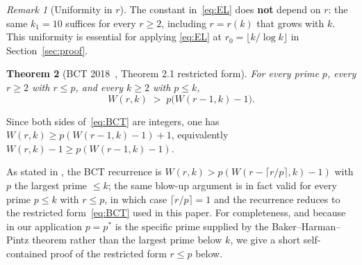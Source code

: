 \documentclass[11pt,reqno,a4paper]{amsart}
\theoremstyle{plain}
\newtheorem{theorem}{Theorem}[section]
\theoremstyle{definition}
\theoremstyle{remark}
\newtheorem{remark}[theorem]{Remark}
\numberwithin{equation}{section}
\begin{document}
\begin{remark}[Uniformity in $r$]
\label{rem:EL-uniform}
The constant in~\eqref{eq:EL} does \textbf{not} depend on $r$: the
same $k_{1}=10$ suffices for every $r\ge 2$, including
$r=r(k)$ that grows with $k$. This uniformity is essential for applying
\eqref{eq:EL} at $r_{0}=\lfloor k/\log k\rfloor$ in
Section~\ref{sec:proof}.
\end{remark}

\begin{theorem}[BCT 2018~\cite{BCT}, Theorem 2.1 restricted form]
\label{thm:BCT}
For every prime $p$, every $r\ge 2$ with $r\le p$, and every $k\ge 2$
with $p\le k$,
\begin{equation}
W(r,k)\;>\;p\bigl(W(r-1,k)-1\bigr).
\label{eq:BCT}
\end{equation}
\end{theorem}

\noindent Since both sides of~\eqref{eq:BCT} are integers, one has
$W(r,k)\ge p(W(r-1,k)-1)+1$, equivalently
$W(r,k)-1\ge p(W(r-1,k)-1)$.

As stated in \cite[Theorem~2.1]{BCT}, the BCT recurrence is
$W(r,k)>p(W(r-\lceil r/p\rceil,k)-1)$ with $p$ the largest prime
$\le k$; the same blow-up argument is in fact valid for every prime
$p\le k$ with $r\le p$, in which case $\lceil r/p\rceil=1$ and the
recurrence reduces to the restricted form~\eqref{eq:BCT} used in this
paper. For completeness, and because in our application $p=p^{*}$ is
the specific prime supplied by the Baker--Harman--Pintz theorem rather
than the largest prime below $k$, we give a short self-contained proof
of the restricted form $r\le p$ below.
\end{document}
